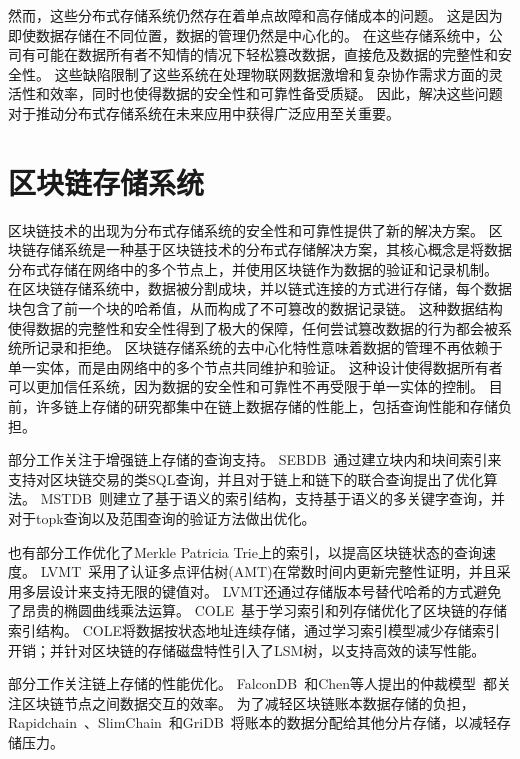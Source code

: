 然而，这些分布式存储系统仍然存在着单点故障和高存储成本的问题。
这是因为即使数据存储在不同位置，数据的管理仍然是中心化的。
在这些存储系统中，公司有可能在数据所有者不知情的情况下轻松篡改数据，直接危及数据的完整性和安全性。
这些缺陷限制了这些系统在处理物联网数据激增和复杂协作需求方面的灵活性和效率，同时也使得数据的安全性和可靠性备受质疑。
因此，解决这些问题对于推动分布式存储系统在未来应用中获得广泛应用至关重要。


\section{区块链存储系统}
区块链技术的出现为分布式存储系统的安全性和可靠性提供了新的解决方案。
区块链存储系统是一种基于区块链技术的分布式存储解决方案，其核心概念是将数据分布式存储在网络中的多个节点上，并使用区块链作为数据的验证和记录机制。
在区块链存储系统中，数据被分割成块，并以链式连接的方式进行存储，每个数据块包含了前一个块的哈希值，从而构成了不可篡改的数据记录链。
这种数据结构使得数据的完整性和安全性得到了极大的保障，任何尝试篡改数据的行为都会被系统所记录和拒绝。
区块链存储系统的去中心化特性意味着数据的管理不再依赖于单一实体，而是由网络中的多个节点共同维护和验证。
这种设计使得数据所有者可以更加信任系统，因为数据的安全性和可靠性不再受限于单一实体的控制。
目前，许多链上存储的研究都集中在链上数据存储的性能上，包括查询性能和存储负担。

部分工作关注于增强链上存储的查询支持。
SEBDB~\cite{zhu2019sebdb}通过建立块内和块间索引来支持对区块链交易的类SQL查询，并且对于链上和链下的联合查询提出了优化算法。
MSTDB~\cite{zhou2022mstdb}则建立了基于语义的索引结构，支持基于语义的多关键字查询，并对于topk查询以及范围查询的验证方法做出优化。

也有部分工作优化了Merkle Patricia Trie上的索引，以提高区块链状态的查询速度。
LVMT~\cite{li2023lvmt}采用了认证多点评估树(AMT)在常数时间内更新完整性证明，并且采用多层设计来支持无限的键值对。
LVMT还通过存储版本号替代哈希的方式避免了昂贵的椭圆曲线乘法运算。
COLE~\cite{zhang2024cole}基于学习索引和列存储优化了区块链的存储索引结构。
COLE将数据按状态地址连续存储，通过学习索引模型减少存储索引开销；并针对区块链的存储磁盘特性引入了LSM树，以支持高效的读写性能。

部分工作关注链上存储的性能优化。
FalconDB~\cite{peng2020falcondb}和Chen等人提出的仲裁模型~\cite{chen2022blockchain}都关注区块链节点之间数据交互的效率。
为了减轻区块链账本数据存储的负担，Rapidchain~\cite{zamani2018rapidchain}、SlimChain~\cite{xu2021slimchain}和GriDB~\cite{hong2023gridb}将账本的数据分配给其他分片存储，以减轻存储压力。

